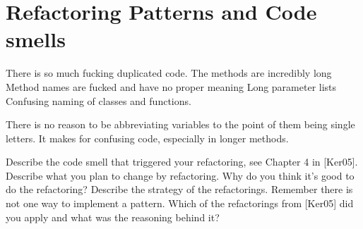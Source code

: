 \section{Refactoring Patterns and Code smells}

There is so much fucking duplicated code.
The methods are incredibly long
Method names are fucked and have no proper meaning
Long parameter lists
Confusing naming of classes and functions.

There is no reason to be abbreviating variables to the point of them being single letters. It makes for confusing code, especially in longer methods.

Describe the code smell that triggered your refactoring, see Chapter 4 in [Ker05].
Describe what you plan to change by refactoring.
Why do you think it's good to do the refactoring?
Describe the strategy of the refactorings. Remember there is not one way to implement a pattern.
Which of the refactorings from [Ker05] did you apply and what was the reasoning behind it?
